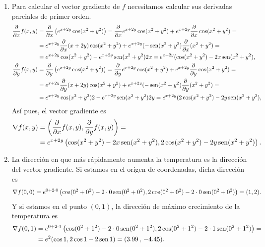 {\begin{enumerate}
\item Para calcular el vector gradiente de $f$ necesitamos calcular sus derivadas parciales de primer orden.
\begin{align*}
\frac{\partial}{\partial x}f(x,y) &= \frac{\partial}{\partial x}\left(e^{x+2y}\cos(x^{2}+y^{2})\right) = \frac{\partial}{\partial x}e^{x+2y}\cos(x^{2}+y^{2}) + e^{x+2y}\frac{\partial}{\partial x}\cos(x^{2}+y^{2}) = \\
&= e^{x+2y}\frac{\partial}{\partial x}(x+2y)\cos(x^{2}+y^{2})+e^{x+2y}(-\operatorname{sen}(x^{2}+y^{2})\frac{\partial}{\partial x}(x^{2}+y^{2}) =\\
&= e^{x+2y}\cos(x^{2}+y^{2})-e^{x+2y}\operatorname{sen}(x^{2}+y^{2})2x = e^{x+2y}(\cos(x^{2}+y^{2})-2x\operatorname{sen}(x^{2}+y^{2}),
\\
\frac{\partial}{\partial y}f(x,y) &= \frac{\partial}{\partial y}\left(e^{x+2y}\cos(x^{2}+y^{2})\right) = \frac{\partial}{\partial y}e^{x+2y}\cos(x^{2}+y^{2}) + e^{x+2y}\frac{\partial}{\partial y}\cos(x^{2}+y^{2}) = \\
&= e^{x+2y}\frac{\partial}{\partial y}(x+2y)\cos(x^{2}+y^{2})+e^{x+2y}(-\operatorname{sen}(x^{2}+y^{2})\frac{\partial}{\partial y}(x^{2}+y^{2}) =\\
&= e^{x+2y}\cos(x^{2}+y^{2})2-e^{x+2y}\operatorname{sen}(x^{2}+y^{2})2y= e^{x+2y}(2\cos(x^{2}+y^{2})-2y\operatorname{sen}(x^{2}+y^{2}),
\end{align*}
Así pues, el vector gradiente es
\begin{align*}
\nabla f(x,y) &= \left(\dfrac{\partial}{\partial x}f(x,y),\dfrac{\partial}{\partial y}f(x,y)\right) =\\
&= e^{x+2y}\left(\cos(x^{2}+y^{2})-2x\operatorname{sen}(x^{2}+y^{2}), 2\cos(x^{2}+y^{2})-2y\operatorname{sen}(x^{2}+y^{2})\right).
\end{align*}

\item La dirección en que más rápidamente aumenta la temperatura es la dirección del vector gradiente. Si estamos en el origen de coordenadas, dicha dirección es
\[
\nabla f(0,0) = e^{0+2\cdot 0}\left(\cos(0^{2}+0^{2})-2\cdot 0\operatorname{sen}(0^{2}+0^{2}), 2\cos(0^{2}+0^{2})-2\cdot 0\operatorname{sen}(0^{2}+0^{2})\right) = (1,2).
\]
Y si estamos en el punto $(0,1)$, la dirección de máximo crecimiento de la temperatura es
\begin{align*}
\nabla f(0,1) &= e^{0+2\cdot 1}\left(\cos(0^{2}+1^{2})-2\cdot 0\operatorname{sen}(0^{2}+1^{2}), 2\cos(0^{2}+1^{2})-2\cdot 1\operatorname{sen}(0^{2}+1^{2})\right) =\\
&= e^{2}(\cos 1, 2\cos 1-2\operatorname{sen} 1) = (3.99\,,\,-4.45).
\end{align*}


\end{enumerate}}

